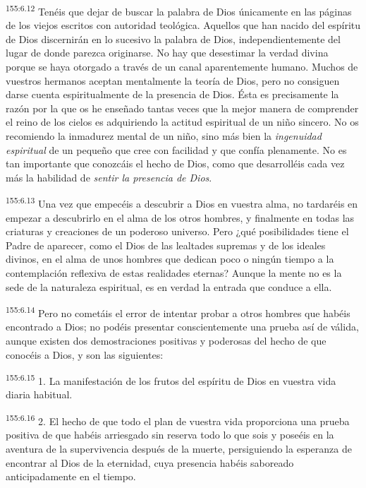 \par 
\textsuperscript{155:6.12} Tenéis que dejar de buscar la palabra de Dios únicamente en las páginas de los viejos escritos con autoridad teológica. Aquellos que han nacido del espíritu de Dios discernirán en lo sucesivo la palabra de Dios, independientemente del lugar de donde parezca originarse. No hay que desestimar la verdad divina porque se haya otorgado a través de un canal aparentemente humano. Muchos de vuestros hermanos aceptan mentalmente la teoría de Dios, pero no consiguen darse cuenta espiritualmente de la presencia de Dios. Ésta es precisamente la razón por la que os he enseñado tantas veces que la mejor manera de comprender el reino de los cielos es adquiriendo la actitud espiritual de un niño sincero. No os recomiendo la inmadurez mental de un niño, sino más bien la \textit{ingenuidad espiritual} de un pequeño que cree con facilidad y que confía plenamente. No es tan importante que conozcáis el hecho de Dios, como que desarrolléis cada vez más la habilidad de \textit{sentir la presencia de Dios}.

\par 
\textsuperscript{155:6.13} Una vez que empecéis a descubrir a Dios en vuestra alma, no tardaréis en empezar a descubrirlo en el alma de los otros hombres, y finalmente en todas las criaturas y creaciones de un poderoso universo. Pero ¿qué posibilidades tiene el Padre de aparecer, como el Dios de las lealtades supremas y de los ideales divinos, en el alma de unos hombres que dedican poco o ningún tiempo a la contemplación reflexiva de estas realidades eternas? Aunque la mente no es la sede de la naturaleza espiritual, es en verdad la entrada que conduce a ella.

\par 
\textsuperscript{155:6.14} Pero no cometáis el error de intentar probar a otros hombres que habéis encontrado a Dios; no podéis presentar conscientemente una prueba así de válida, aunque existen dos demostraciones positivas y poderosas del hecho de que conocéis a Dios, y son las siguientes:

\par 
\textsuperscript{155:6.15} 1. La manifestación de los frutos del espíritu de Dios en vuestra vida diaria habitual.

\par 
\textsuperscript{155:6.16} 2. El hecho de que todo el plan de vuestra vida proporciona una prueba positiva de que habéis arriesgado sin reserva todo lo que sois y poseéis en la aventura de la supervivencia después de la muerte, persiguiendo la esperanza de encontrar al Dios de la eternidad, cuya presencia habéis saboreado anticipadamente en el tiempo.

